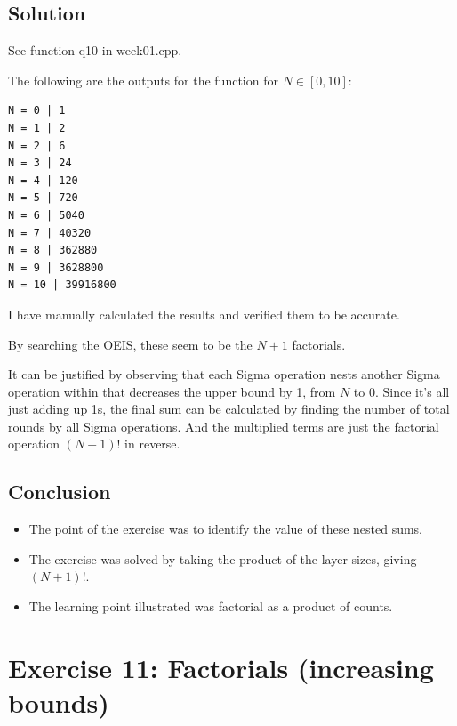 \documentclass[12pt]{article}
\begin{document}

\subsection{Solution}

See function q10 in week01.cpp.

The following are the outputs for the function for $N \in [0,10]$:

\begin{verbatim}
N = 0 | 1
N = 1 | 2
N = 2 | 6
N = 3 | 24
N = 4 | 120
N = 5 | 720
N = 6 | 5040
N = 7 | 40320
N = 8 | 362880
N = 9 | 3628800
N = 10 | 39916800
\end{verbatim}

I have manually calculated the results and verified them to be accurate.

By searching the OEIS, these seem to be the $N + 1$ factorials.

It can be justified by observing that each Sigma operation nests another Sigma
operation within that decreases the upper bound by 1, from $N$ to 0. Since it's
all just adding up 1s, the final sum can be calculated by finding the number of
total rounds by all Sigma operations. And the multiplied terms are just the
factorial operation $(N + 1)!$ in reverse.


\subsection{Conclusion}

\begin{itemize}

\item
  The point of the exercise was to identify the value of these nested sums.

\item
  The exercise was solved by taking the product of the layer sizes, giving $(N + 1)!$.

\item
  The learning point illustrated was factorial as a product of counts.

\end{itemize}


\newpage

\section{Exercise 11: Factorials (increasing bounds)}
\end{document}
